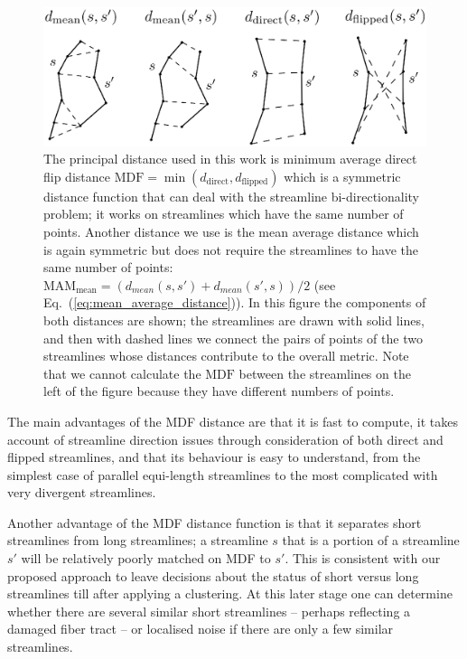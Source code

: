 \documentclass{bioinfo}
\begin{document}
\begin{methods}
\begin{figure}
\includegraphics[scale=0.35]{Figures/Fig_2_distances2}
\centering{}
\caption{The principal distance used in this work is minimum average
  direct flip distance
  $\textrm{MDF}=\min(d_{\textrm{direct}},d_{\textrm{flipped}})$ which is
  a symmetric distance function that can deal with the streamline
  bi-directionality problem; it works on streamlines which have the same
  number of points.  Another distance we use is the mean average
  distance which is again symmetric but does not require the streamlines
  to have the same number of points: $\textrm{MAM}_{\textrm{mean}} =
  (d_{mean}(s, s') + d_{mean}(s',s))/2$ (see Eq.~(\ref{eq:mean_average_distance})).  In this
  figure the components of both distances are shown; the streamlines are
  drawn with solid lines, and then with dashed lines we connect the
  pairs of points of the two streamlines whose distances contribute to
  the overall metric. Note that we cannot calculate the $\textrm{MDF}$
  between the streamlines on the left of the figure because they have
  different numbers of points.
  \label{Flo:Distances_used}}
\end{figure}

The main advantages of the MDF distance are that it is fast to compute,
it takes account of streamline direction issues through consideration of
both direct and flipped streamlines, and that its behaviour is easy to
understand, from the simplest case of parallel equi-length streamlines
to the most complicated with very divergent streamlines. 

Another advantage of the MDF distance function is that it separates
short streamlines from long streamlines; a streamline $s$ that is a
portion of a streamline $s'$ will be relatively poorly matched on MDF to
$s'$. This is consistent with our proposed approach to leave decisions
about the status of short versus long streamlines till after applying a
clustering. At this later stage one can determine whether there are
several similar short streamlines -- perhaps reflecting a damaged fiber
tract -- or localised noise if there are only a few similar streamlines.


\end{methods}
\end{document}
